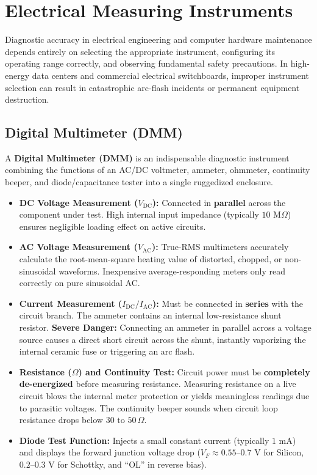 \section{Electrical Measuring Instruments}

Diagnostic accuracy in electrical engineering and computer hardware maintenance depends entirely on selecting the appropriate instrument, configuring its operating range correctly, and observing fundamental safety precautions. In high-energy data centers and commercial electrical switchboards, improper instrument selection can result in catastrophic arc-flash incidents or permanent equipment destruction.

\subsection{Digital Multimeter (DMM)}
A \textbf{Digital Multimeter (DMM)} is an indispensable diagnostic instrument combining the functions of an AC/DC voltmeter, ammeter, ohmmeter, continuity beeper, and diode/capacitance tester into a single ruggedized enclosure.

\begin{keyconcept}
\begin{itemize}[leftmargin=*]
    \item \textbf{DC Voltage Measurement ($V_{\text{DC}}$):} Connected in \textbf{parallel} across the component under test. High internal input impedance (typically $10\text{ M}\Omega$) ensures negligible loading effect on active circuits.
    \item \textbf{AC Voltage Measurement ($V_{\text{AC}}$):} True-RMS multimeters accurately calculate the root-mean-square heating value of distorted, chopped, or non-sinusoidal waveforms. Inexpensive average-responding meters only read correctly on pure sinusoidal AC.
    \item \textbf{Current Measurement ($I_{\text{DC}} / I_{\text{AC}}$):} Must be connected in \textbf{series} with the circuit branch. The ammeter contains an internal low-resistance shunt resistor. \textbf{Severe Danger:} Connecting an ammeter in parallel across a voltage source causes a direct short circuit across the shunt, instantly vaporizing the internal ceramic fuse or triggering an arc flash.
    \item \textbf{Resistance ($\Omega$) and Continuity Test:} Circuit power must be \textbf{completely de-energized} before measuring resistance. Measuring resistance on a live circuit blows the internal meter protection or yields meaningless readings due to parasitic voltages. The continuity beeper sounds when circuit loop resistance drops below $30\text{ to }50\,\Omega$.
    \item \textbf{Diode Test Function:} Injects a small constant current (typically $1\text{ mA}$) and displays the forward junction voltage drop ($V_F \approx 0.55\text{--}0.7\text{ V}$ for Silicon, $0.2\text{--}0.3\text{ V}$ for Schottky, and ``OL'' in reverse bias).
\end{itemize}
\end{keyconcept}

